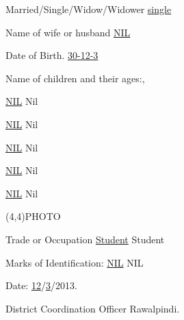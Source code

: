 \documentclass{article}
\begin{document}
Married/Single/Widow/Widower \underline{\hspace{1cm}single\hspace{1cm}}

Name of wife or husband \underline{\hspace{1cm}NIL\hspace{1cm}}

Date of Birth. \underline{\hspace{1cm}30-12-3\hspace{1cm}}

Name of children and their ages:,

\underline{\hspace{1cm}NIL\hspace{1cm}} Nil

\underline{\hspace{1cm}NIL\hspace{1cm}} Nil

\underline{\hspace{1cm}NIL\hspace{1cm}} Nil

\underline{\hspace{1cm}NIL\hspace{1cm}} Nil

\underline{\hspace{1cm}NIL\hspace{1cm}} Nil

\vspace{0.5cm}
\begin{center}
\framebox(4,4){PHOTO}
\end{center}

Trade or Occupation \underline{\hspace{1cm}Student\hspace{1cm}} Student

Marks of Identification: \underline{\hspace{1cm}NIL\hspace{1cm}} NIL

\vspace{0.5cm}

Date: \underline{\hspace{1cm}12\hspace{1cm}}/\underline{\hspace{1cm}3\hspace{1cm}}/2013.

\vspace{0.5cm}

District Coordination Officer
Rawalpindi.
\end{document}
